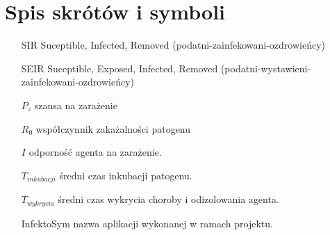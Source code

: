 \chapter{Spis skrótów i symboli}

\begin{itemize}
\item[SIR] Suceptible, Infected, Removed (podatni-zainfekowani-ozdrowieńcy)
\item[SEIR] Suceptible, Exposed, Infected, Removed (podatni-wystawieni-zainfekowani-ozdrowieńcy)
\item[$P_z$] szansa na zarażenie
\item[$R_0$] współczynnik zakażalności patogenu
\item[$I$] odporność agenta na zarażenie.
\item[$T_{inkubacji}$] średni czas inkubacji patogenu.
\item[$T_{wykrycia}$] średni czas wykrycia choroby i odizolowania agenta.
\item[InfektoSym] nazwa aplikacji wykonanej w ramach projektu.
\end{itemize}
